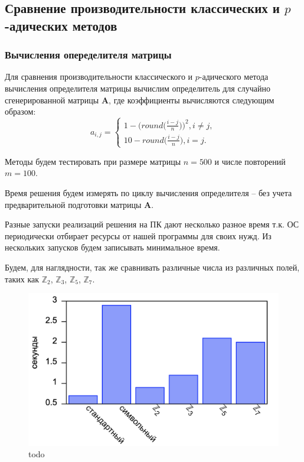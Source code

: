 \documentclass[master, och, diploma, times]{sty/SCWorks}
\theoremstyle{plain}
\theoremstyle{definition}
\begin{document}
\subsection{Сравнение производительности классических и $p$-адических \mbox{методов}}

\subsubsection{Вычисления опеределителя матрицы}

Для сравнения производительности классического и $p$-адического метода вычисления определителя матрицы вычислим определитель для случайно сгенерированной матрицы $\boldsymbol{A}$, где коэффициенты вычисляются следующим образом:
$$
a_{i,j}= 
\begin{cases} 
1-\bigg(round\bigg(\frac{i-j}{n}\bigg)\bigg)^2, i \neq j, \\ 
10-round\bigg(\frac{i-j}{n}\bigg), i = j.
\end{cases}
$$

Методы будем тестировать при размере матрицы $n=500$ и числе повторений $m=100$.

Время решения будем измерять по циклу вычисления определителя – без учета предварительной подготовки матрицы $\boldsymbol{A}$.

Разные запуски реализаций решения на ПК дают несколько разное время т.к. ОС периодически отбирает ресурсы от нашей программы для своих нужд. Из нескольких запусков будем записывать минимальное время.

Будем, для наглядности, так же сравнивать различные числа из различных полей, таких как $\mathbb{Z}_2$, $\mathbb{Z}_3$, $\mathbb{Z}_5$, $\mathbb{Z}_7$.

\begin{figure}[H]
\centerline{\includegraphics[width=0.85\linewidth]{../gnuplot/single/det/plot.png}}
\caption{todo}
\label{img:single:det}
\end{figure}
\end{document}
